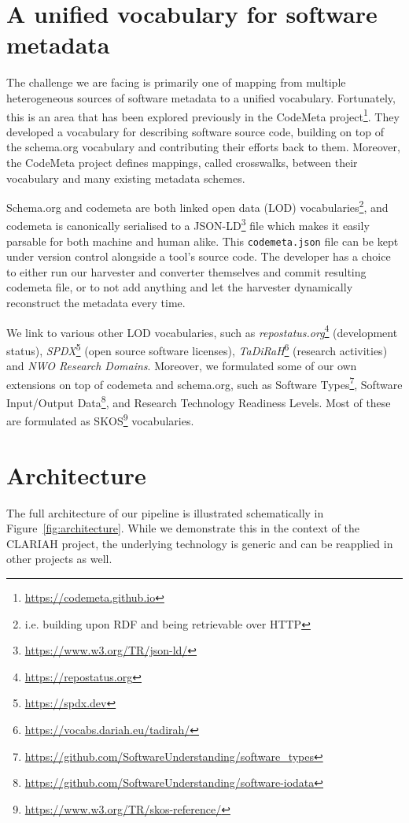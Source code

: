 \documentclass[a4paper,11pt]{article}
\begin{document}
\section{A unified vocabulary for software metadata}

The challenge we are facing is primarily one of mapping from multiple
heterogeneous sources of software metadata to a unified vocabulary.
Fortunately, this is an area that has been explored previously in the CodeMeta
project\footnote{\url{https://codemeta.github.io}}. They developed a
vocabulary for describing software source code, building on top of the
schema.org vocabulary and contributing their efforts back to them. Moreover,
the CodeMeta project defines mappings, called crosswalks, between their
vocabulary and many existing metadata schemes. 

Schema.org and codemeta are both linked open data (LOD)
vocabularies\footnote{i.e. building upon RDF and being retrievable over HTTP},
and codemeta is canonically serialised to a
JSON-LD\footnote{\url{https://www.w3.org/TR/json-ld/}} file which makes it
easily parsable for both machine and human alike. This \texttt{codemeta.json}
file can be kept under version control alongside a tool's source code. The
developer has a choice to either run our harvester and converter themselves and
commit resulting codemeta file, or to not add anything and let the harvester
dynamically reconstruct the metadata every time.

We link to various other LOD vocabularies, such as
\emph{repostatus.org}\footnote{\url{https://repostatus.org}} (development
status), \emph{SPDX}\footnote{\url{https://spdx.dev}} (open source software
licenses), \emph{TaDiRaH}\footnote{\url{https://vocabs.dariah.eu/tadirah/}}
(research activities) \citep{TADIRAH} and \emph{NWO Research Domains}.
Moreover, we formulated some of our own extensions on top of codemeta and
schema.org, such as Software
Types\footnote{\url{https://github.com/SoftwareUnderstanding/software_types}},
Software Input/Output
Data\footnote{\url{https://github.com/SoftwareUnderstanding/software-iodata}},
and Research Technology Readiness Levels. Most of these are formulated as SKOS\footnote{\url{https://www.w3.org/TR/skos-reference/}}
vocabularies.

\section{Architecture}

The full architecture of our pipeline is illustrated schematically in
Figure~\ref{fig:architecture}. While we demonstrate this in the context of the
CLARIAH project, the underlying technology is generic and can be reapplied in
other projects as well.
\end{document}
